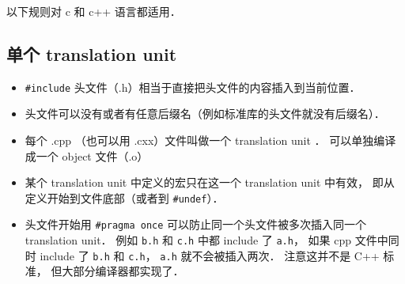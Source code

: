 
\begin{issues}
\issueDraft
\end{issues}


以下规则对 c 和 c++ 语言都适用．

\subsection{单个 translation unit}
\begin{itemize}
\item \verb|#include| 头文件（.h）相当于直接把头文件的内容插入到当前位置．
\item 头文件可以没有或者有任意后缀名（例如标准库的头文件就没有后缀名）．
\item 每个 .cpp （也可以用 .cxx）文件叫做一个 translation unit ． 可以单独编译成一个 object 文件（.o）
\item 某个 translation unit 中定义的宏只在这一个 translation unit 中有效， 即从定义开始到文件底部（或者到 \verb|#undef|）．
\item 头文件开始用 \verb|#pragma once| 可以防止同一个头文件被多次插入同一个 translation unit． 例如 \verb|b.h| 和 \verb|c.h| 中都 include 了 \verb|a.h|， 如果 cpp 文件中同时 include 了 \verb|b.h| 和 \verb|c.h|， \verb|a.h| 就不会被插入两次． 注意这并不是 C++ 标准， 但大部分编译器都实现了．
\end{itemize}


